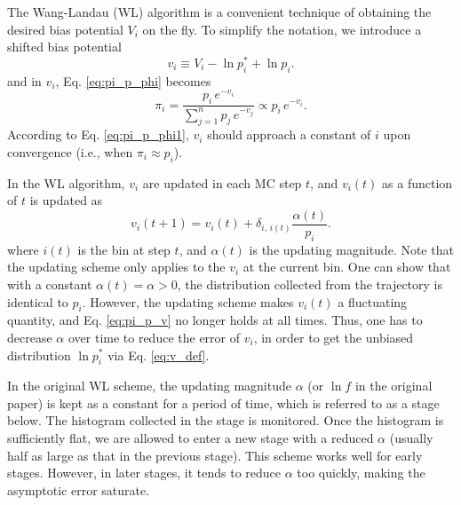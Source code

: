 \documentclass[reprint]{revtex4-1}
\begin{document}
The Wang-Landau (WL) algorithm is a convenient technique
of obtaining the desired bias potential $V_i$
on the fly.
%
To simplify the notation, we introduce
a shifted bias potential
%
\begin{equation}
  v_i \equiv V_i - \ln p^*_i + \ln p_i.
  \label{eq:v_def}
\end{equation}
%
%
and in $v_i$, Eq. \eqref{eq:pi_p_phi}
becomes
%
\begin{equation}
  \pi_i
  =
  \frac{                p_i \, e^{-v_i} }
       { \sum_{j = 1}^n p_j \, e^{-v_j} }
  \propto
  p_i \, e^{-v_i}.
  \label{eq:pi_p_v}
\end{equation}
%
According to Eq. \eqref{eq:pi_p_phi1},
$v_i$ should approach a constant of $i$
upon convergence (i.e., when $\pi_i \approx p_i$).



In the WL algorithm, $v_i$ are updated
in each MC step $t$,
and $v_i(t)$ as a function of $t$
is updated as
%
\begin{equation}
  v_i(t+1)
  =
  v_i(t)
  +
  \delta_{i, \, i(t)}
  \frac{ \alpha(t) } { p_i }.
  \label{eq:wl_update}
\end{equation}
%
where $i(t)$ is the bin at step $t$,
and $\alpha(t)$ is the updating magnitude.
%
Note that the updating scheme only applies
to the $v_i$ at the current bin.
%
One can show that with a constant $\alpha(t) = \alpha > 0$,
the distribution collected from
the trajectory is identical to $p_i$.
%
However, the updating scheme
makes $v_i(t)$ a fluctuating quantity,
and Eq. \eqref{eq:pi_p_v} no longer holds
at all times.
%
Thus, one has to decrease $\alpha$ over time
to reduce the error of $v_i$,
in order to get the unbiased distribution
$\ln p_i^*$ via Eq. \eqref{eq:v_def}.





In the original WL scheme,
the updating magnitude $\alpha$ (or $\ln f$
in the original paper) is kept as a constant
for a period of time,
which is referred to as a stage below.
%
The histogram collected in the stage is monitored.
%
Once the histogram is sufficiently flat,
we are allowed to enter a new stage
with a reduced $\alpha$
(usually half as large as
that in the previous stage).
%
This scheme works well for early stages.
%
However, in later stages, it tends to reduce $\alpha$
too quickly, making the asymptotic error
saturate.
\end{document}
